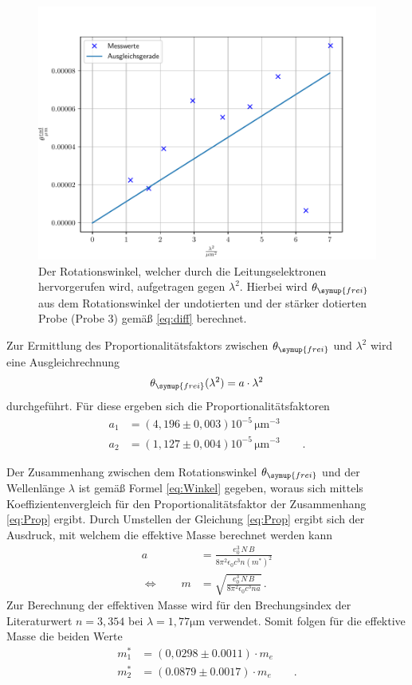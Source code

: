 \begin{figure}[h]
    \centering
    \includegraphics[width=1\textwidth]{Winkel_frei2.pdf}
    \caption{Der Rotationswinkel, welcher durch die Leitungselektronen hervorgerufen wird, aufgetragen gegen $\lambda^2$. Hierbei wird $\theta_{\symup{frei}}$ aus dem Rotationswinkel der undotierten und der stärker dotierten Probe (Probe 3) gemäß \ref{eq:diff} berechnet.}
    \label{fig:afig6}
\end{figure}
\FloatBarrier
\noindent

Zur Ermittlung des Proportionalitätsfaktors zwischen $\theta_{\symup{frei}}$ und
$\lambda^2$ wird eine Ausgleichrechnung
\begin{equation*}
    \theta_{\symup{frei}}(\lambda^2) = a\cdot \lambda ^2
\end{equation*}
durchgeführt.
Für diese ergeben sich die Proportionalitätsfaktoren
\begin{align*}
    a_1 &= (4,196 \pm 0,003)10^{-5}\, \si{\micro\meter}^{-3}\\
    a_2 &= (1,127 \pm 0,004)10^{-5}\, \si{\micro\meter}^{-3} \qquad .
\end{align*}

Der Zusammenhang zwischen dem Rotationswinkel $\theta_{\symup{frei}}$ und der Wellenlänge $\lambda$ ist gemäß Formel \ref{eq:Winkel}
gegeben, woraus sich mittels Koeffizientenvergleich für den Proportionalitätsfaktor der Zusammenhang \ref{eq:Prop} ergibt. Durch Umstellen der Gleichung \ref{eq:Prop} ergibt
sich der Ausdruck, mit welchem die effektive Masse berechnet werden kann
\begin{align}
   a &= \frac{e_0^3 \, N \, B}{8 \pi^2 \epsilon_0 c^3 n (m^{*})^2}\\ \label{eq:Prop}
   \Leftrightarrow\qquad m &= \sqrt{\frac{e_0^3 \, N \, B}{8 \pi^2 \epsilon_0 c^3 n a}} \, .
\end{align}
Zur Berechnung der effektiven Masse wird für den Brechungsindex der Literaturwert $n=3,354$ bei $\lambda = 1,77 \si{\micro\meter}$ \cite{quelle04} verwendet. Somit folgen für die effektive Masse die beiden Werte
\begin{align*}
    m_1^{*} &= (0,0298 \pm 0.0011)\cdot m_e \\
    m_2^{*} &= (0.0879 \pm 0.0017)\cdot m_e \qquad .
\end{align*}

